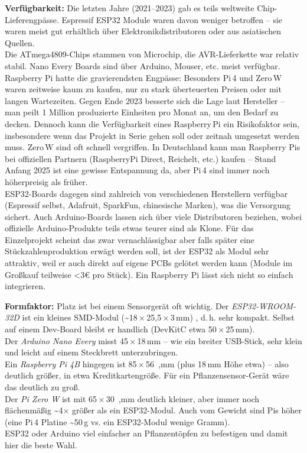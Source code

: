 \noindent\textbf{Verfügbarkeit:} Die letzten Jahre (2021–2023) gab es teils weltweite Chip-Lieferengpässe. Espressif ESP32 Module waren davon weniger betroffen – sie waren meist gut erhältlich über Elektronikdistributoren oder aus asiatischen Quellen.  
\\
Die ATmega4809-Chips stammen von Microchip, die AVR-Lieferkette war relativ stabil. Nano Every Boards sind über Arduino, Mouser, etc. meist verfügbar.
\\
Raspberry Pi hatte die gravierendsten Engpässe: Besonders Pi\,4 und Zero\,W waren zeitweise kaum zu kaufen, nur zu stark überteuerten Preisen oder mit langen Wartezeiten. Gegen Ende 2023 besserte sich die Lage laut Hersteller – man peilt 1 Million produzierte Einheiten pro Monat an, um den Bedarf zu decken. \autocite{raspberry_pi_availability} Dennoch kann die Verfügbarkeit eines Raspberry\,Pi ein Risikofaktor sein, insbesondere wenn das Projekt in Serie gehen soll oder zeitnah umgesetzt werden muss. Zero\,W sind oft schnell vergriffen. In Deutschland kann man Raspberry Pis bei offiziellen Partnern (RaspberryPi Direct, Reichelt, etc.) kaufen – Stand Anfang 2025 ist eine gewisse Entspannung da, aber Pi\,4 sind immer noch höherpreisig als früher. 
\\
ESP32-Boards dagegen sind zahlreich von verschiedenen Herstellern verfügbar (Espressif selbst, Adafruit, SparkFun, chinesische Marken), was die Versorgung sichert. Auch Arduino-Boards lassen sich über viele Distributoren beziehen, wobei offizielle Arduino-Produkte teils etwas teurer sind als Klone. Für das Einzelprojekt scheint das zwar vernachlässigbar aber falls später eine Stückzahlenproduktion erwägt werden soll, ist der ESP32 als Modul sehr attraktiv, weil er auch direkt auf eigene PCBs gelötet werden kann (Module im Großkauf teilweise <3\;€ pro Stück). Ein Raspberry Pi lässt sich nicht so einfach integrieren.

\vspace{5mm}

\noindent\textbf{Formfaktor:} Platz ist bei einem Sensorgerät oft wichtig. Der \textit{ESP32-WROOM-32D} ist ein kleines SMD-Modul (\textasciitilde18\,×\,25{,}5\,×\,3\,mm) \autocite{esp_datasheet}, d.\,h. sehr kompakt. Selbst auf einem Dev-Board bleibt er handlich (DevKitC etwa 50\,×\,25\,mm). 
\\
Der \textit{Arduino Nano Every} misst 45\,×\,18\,mm \autocite{atmega_datasheet} – wie ein breiter USB-Stick, sehr klein und leicht auf einem Steckbrett unterzubringen. 
\\
Ein \textit{Raspberry Pi 4B} hingegen ist 85\,×\,56\ \autocite{raspberry_pi_datasheet},mm (plus 18\,mm Höhe etwa) – also deutlich größer, in etwa Kreditkartengröße. Für ein Pflanzensensor-Gerät wäre das deutlich zu groß. 
\\
Der \textit{Pi Zero W} ist mit 65\,×\,30\ \autocite{raspberry_pi_w_datasheet},mm deutlich kleiner, aber immer noch flächenmäßig \textasciitilde4$\times$ größer als ein ESP32-Modul. Auch vom Gewicht sind Pis höher (eine Pi\,4 Platine \textasciitilde50\,g vs. ein ESP32-Modul wenige Gramm). 
\\
ESP32 oder Arduino viel einfacher an Pflanzentöpfen zu befestigen und damit hier die beste Wahl.


